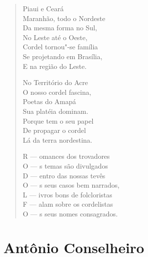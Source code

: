 \begin{verse}
Piaui e Ceará \\
Maranhão, todo o Nordeste \\
Da mesma forma no Sul, \\
No Leste até o Oeste, \\
Cordel tornou"-se família \\
Se projetando em Brasília, \\
E na região do Leste. 


No Território do Acre \\
O nosso cordel fascina, \\
Poetas do Amapá \\
Sua platéia dominam. \\
Porque tem o seu papel \\
De propagar o cordel \\
Lá da terra nordestina. 

R --- omances dos trovadores \\
O --- s temas são divulgados \\
D --- entro das nossas tevês \\
O --- s seus casos bem narrados, \\
L --- ivros bons de folcloristas \\
F --- alam sobre os cordelistas \\
O --- s seus nomes consagrados. 
\end{verse}

\chapter{Antônio Conselheiro}

